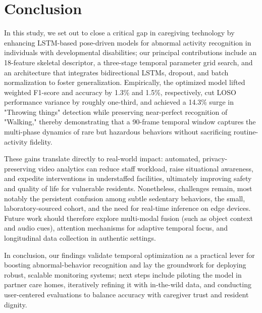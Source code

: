 \documentclass{iopconfser}
\begin{document}
\section{Conclusion}

In this study, we set out to close a critical gap in caregiving technology by enhancing LSTM-based pose-driven models for abnormal activity recognition in individuals with developmental disabilities; our principal contributions include an 18-feature skeletal descriptor, a three-stage temporal parameter grid search, and an architecture that integrates bidirectional LSTMs, dropout, and batch normalization to foster generalization. Empirically, the optimized model lifted weighted F1-score and accuracy by 1.3\% and 1.5\%, respectively, cut LOSO performance variance by roughly one-third, and achieved a 14.3\% surge in "Throwing things" detection while preserving near-perfect recognition of "Walking," thereby demonstrating that a 90-frame temporal window captures the multi-phase dynamics of rare but hazardous behaviors without sacrificing routine-activity fidelity.

These gains translate directly to real-world impact: automated, privacy-preserving video analytics can reduce staff workload, raise situational awareness, and expedite interventions in understaffed facilities, ultimately improving safety and quality of life for vulnerable residents. Nonetheless, challenges remain, most notably the persistent confusion among subtle sedentary behaviors, the small, laboratory-sourced cohort, and the need for real-time inference on edge devices. Future work should therefore explore multi-modal fusion (such as object context and audio cues), attention mechanisms for adaptive temporal focus, and longitudinal data collection in authentic settings.

In conclusion, our findings validate temporal optimization as a practical lever for boosting abnormal-behavior recognition and lay the groundwork for deploying robust, scalable monitoring systems; next steps include piloting the model in partner care homes, iteratively refining it with in-the-wild data, and conducting user-centered evaluations to balance accuracy with caregiver trust and resident dignity.



\end{document}
